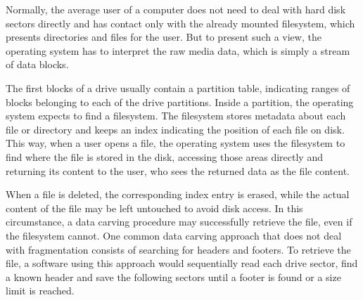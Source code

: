 

Normally, the average user of a computer does not need to deal with hard disk sectors directly and has contact only with the already mounted filesystem, which presents directories and files for the user. But to present such a view, the operating system has to interpret the raw media data, which is simply a stream of data blocks.

The first blocks of a drive usually contain a partition table, indicating ranges of blocks belonging to each of the drive partitions. Inside a partition, the operating system expects to find a filesystem. The filesystem stores metadata about each file or directory and keeps an index indicating the position of each file on disk. This way, when a user opens a file, the operating system uses the filesystem to find where the file is stored in the disk, accessing those areas directly and returning its content to the user, who sees the returned data as the file content. 


When a file is deleted, the corresponding index entry is erased, while the actual content of the file may be left untouched to avoid disk access. In this circumstance, a data carving procedure may successfully retrieve the file, even if the filesystem cannot. One common data carving approach that does not deal with fragmentation consists of searching for headers and footers. To retrieve the file, a software using this approach would sequentially read each drive sector, find a known header and save the following sectors until a footer is found or a size limit is reached. 
